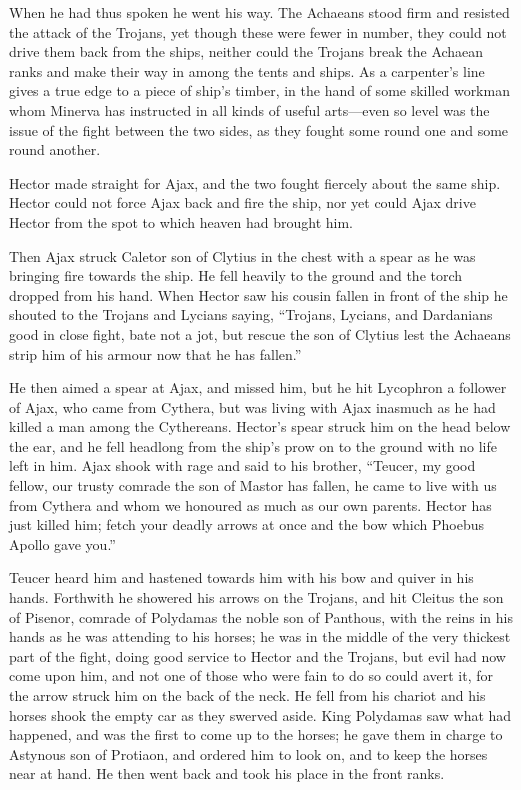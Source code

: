 When he had thus spoken he went his way. The Achaeans stood firm and
resisted the attack of the Trojans, yet though these were fewer in number,
they could not drive them back from the ships, neither could the Trojans
break the Achaean ranks and make their way in among the tents and ships.
As a carpenter’s line gives a true edge to a piece of ship’s timber, in
the hand of some skilled workman whom Minerva has instructed in all kinds
of useful arts—even so level was the issue of the fight between the
two sides, as they fought some round one and some round another.

Hector made straight for Ajax, and the two fought fiercely about the same
ship. Hector could not force Ajax back and fire the ship, nor yet could
Ajax drive Hector from the spot to which heaven had brought him.

Then Ajax struck Caletor son of Clytius in the chest with a spear as he
was bringing fire towards the ship. He fell heavily to the ground and the
torch dropped from his hand. When Hector saw his cousin fallen in front of
the ship he shouted to the Trojans and Lycians saying, “Trojans, Lycians,
and Dardanians good in close fight, bate not a jot, but rescue the son of
Clytius lest the Achaeans strip him of his armour now that he has fallen.”

He then aimed a spear at Ajax, and missed him, but he hit Lycophron a
follower of Ajax, who came from Cythera, but was living with Ajax inasmuch
as he had killed a man among the Cythereans. Hector’s spear struck him on
the head below the ear, and he fell headlong from the ship’s prow on to
the ground with no life left in him. Ajax shook with rage and said to his
brother, “Teucer, my good fellow, our trusty comrade the son of Mastor has
fallen, he came to live with us from Cythera and whom we honoured as much
as our own parents. Hector has just killed him; fetch your deadly arrows
at once and the bow which Phoebus Apollo gave you.”

Teucer heard him and hastened towards him with his bow and quiver in his
hands. Forthwith he showered his arrows on the Trojans, and hit Cleitus
the son of Pisenor, comrade of Polydamas the noble son of Panthous, with
the reins in his hands as he was attending to his horses; he was in the
middle of the very thickest part of the fight, doing good service to
Hector and the Trojans, but evil had now come upon him, and not one of
those who were fain to do so could avert it, for the arrow struck him on
the back of the neck. He fell from his chariot and his horses shook the
empty car as they swerved aside. King Polydamas saw what had happened, and
was the first to come up to the horses; he gave them in charge to Astynous
son of Protiaon, and ordered him to look on, and to keep the horses near
at hand. He then went back and took his place in the front ranks.

